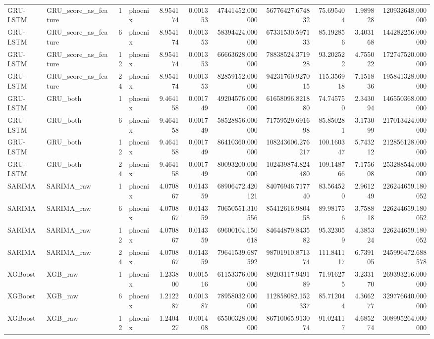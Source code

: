 \begin{longtable}{llrlrrrrrrr}
GRU-LSTM & GRU\_score\_as\_feature & 1 & phoenix & 8.954174 & 0.001353 & 47441452.000000 & 56776427.674832 & 75.695404 & 1.989828 & 120932648.000000 \\
GRU-LSTM & GRU\_score\_as\_feature & 6 & phoenix & 8.954174 & 0.001353 & 58394424.000000 & 67331530.597133 & 85.192856 & 3.403168 & 144282256.000000 \\
GRU-LSTM & GRU\_score\_as\_feature & 12 & phoenix & 8.954174 & 0.001353 & 66663628.000000 & 78838524.371928 & 93.202522 & 4.755022 & 172747520.000000 \\
GRU-LSTM & GRU\_score\_as\_feature & 24 & phoenix & 8.954174 & 0.001353 & 82859152.000000 & 94231760.927015 & 115.356918 & 7.151836 & 195841328.000000 \\
GRU-LSTM & GRU\_both & 1 & phoenix & 9.464158 & 0.001749 & 49204576.000000 & 61658096.821880 & 74.745750 & 2.343094 & 146550368.000000 \\
GRU-LSTM & GRU\_both & 6 & phoenix & 9.464158 & 0.001749 & 58528856.000000 & 71759529.691698 & 85.850281 & 3.173099 & 217013424.000000 \\
GRU-LSTM & GRU\_both & 12 & phoenix & 9.464158 & 0.001749 & 86410360.000000 & 108243606.276217 & 100.160347 & 5.743212 & 212856128.000000 \\
GRU-LSTM & GRU\_both & 24 & phoenix & 9.464158 & 0.001749 & 80093200.000000 & 102439874.824480 & 109.148766 & 7.175608 & 253288544.000000 \\
SARIMA & SARIMA\_raw & 1 & phoenix & 4.070867 & 0.014359 & 68906472.420121 & 84076946.717740 & 83.564520 & 2.961249 & 226244659.180052 \\
SARIMA & SARIMA\_raw & 6 & phoenix & 4.070867 & 0.014359 & 70650551.310556 & 85412616.980458 & 89.981756 & 3.758818 & 226244659.180052 \\
SARIMA & SARIMA\_raw & 12 & phoenix & 4.070867 & 0.014359 & 69600104.150618 & 84644879.843582 & 95.323059 & 4.385324 & 226244659.180052 \\
SARIMA & SARIMA\_raw & 24 & phoenix & 4.070867 & 0.014359 & 79641539.687592 & 98701910.871374 & 111.841117 & 6.739105 & 245996472.688578 \\
XGBoost & XGB\_raw & 1 & phoenix & 1.233800 & 0.001516 & 61153376.000000 & 89203117.949189 & 71.916275 & 3.233170 & 269393216.000000 \\
XGBoost & XGB\_raw & 6 & phoenix & 1.212287 & 0.001387 & 78958032.000000 & 112858082.152337 & 85.712044 & 4.366277 & 329776640.000000 \\
XGBoost & XGB\_raw & 12 & phoenix & 1.240427 & 0.001408 & 65500328.000000 & 86710065.913074 & 91.024117 & 4.685274 & 308995264.000000 \\

\end{longtable}

